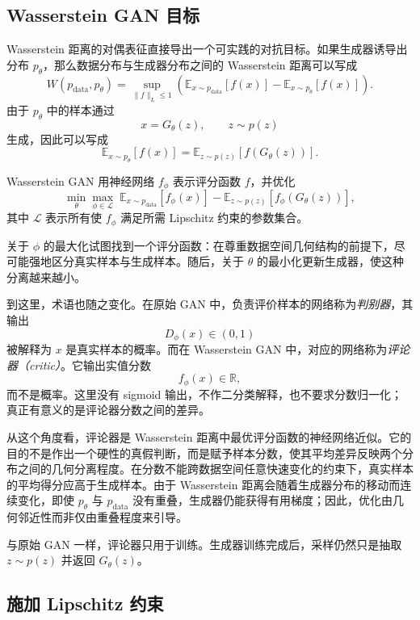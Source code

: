 

\subsection{Wasserstein GAN 目标}

Wasserstein 距离的对偶表征直接导出一个可实践的对抗目标。如果生成器诱导出分布 $p_\theta$，那么数据分布与生成器分布之间的 Wasserstein 距离可以写成
\[
W(p_{\text{data}},p_\theta)
=
\sup_{\|f\|_{L}\leq 1}
\left(
\mathbb{E}_{x\sim p_{\text{data}}}[f(x)]
-
\mathbb{E}_{x\sim p_\theta}[f(x)]
\right).
\]
由于 $p_\theta$ 中的样本通过
\[
x=G_\theta(z),
\qquad z\sim p(z)
\]
生成，因此可以写成
\[
\mathbb{E}_{x\sim p_\theta}[f(x)]
=
\mathbb{E}_{z\sim p(z)}[f(G_\theta(z))].
\]

Wasserstein GAN 用神经网络 $f_\phi$ 表示评分函数 $f$，并优化
\[
\boxed{
\min_\theta \max_{\phi \in \mathcal{L}}
\;
\mathbb{E}_{x \sim p_{\text{data}}}[f_\phi(x)]
-
\mathbb{E}_{z \sim p(z)}[f_\phi(G_\theta(z))],
}
\]
其中 $\mathcal{L}$ 表示所有使 $f_\phi$ 满足所需 Lipschitz 约束的参数集合。

关于 $\phi$ 的最大化试图找到一个评分函数：在尊重数据空间几何结构的前提下，尽可能强地区分真实样本与生成样本。随后，关于 $\theta$ 的最小化更新生成器，使这种分离越来越小。

到这里，术语也随之变化。在原始 GAN 中，负责评价样本的网络称为\emph{判别器}，其输出
\[
D_\phi(x)\in(0,1)
\]
被解释为 $x$ 是真实样本的概率。而在 Wasserstein GAN 中，对应的网络称为\emph{评论器（critic）}。它输出实值分数
\[
f_\phi(x)\in\mathbb{R},
\]
而不是概率。这里没有 sigmoid 输出，不作二分类解释，也不要求分数归一化；真正有意义的是评论器分数之间的差异。

从这个角度看，评论器是 Wasserstein 距离中最优评分函数的神经网络近似。它的目的不是作出一个硬性的真假判断，而是赋予样本分数，使其平均差异反映两个分布之间的几何分离程度。在分数不能跨数据空间任意快速变化的约束下，真实样本的平均得分应高于生成样本。由于 Wasserstein 距离会随着生成器分布的移动而连续变化，即使 $p_\theta$ 与 $p_{\text{data}}$ 没有重叠，生成器仍能获得有用梯度；因此，优化由几何邻近性而非仅由重叠程度来引导。

与原始 GAN 一样，评论器只用于训练。生成器训练完成后，采样仍然只是抽取 $z\sim p(z)$ 并返回 $G_\theta(z)$。

\subsection{施加 Lipschitz 约束}

